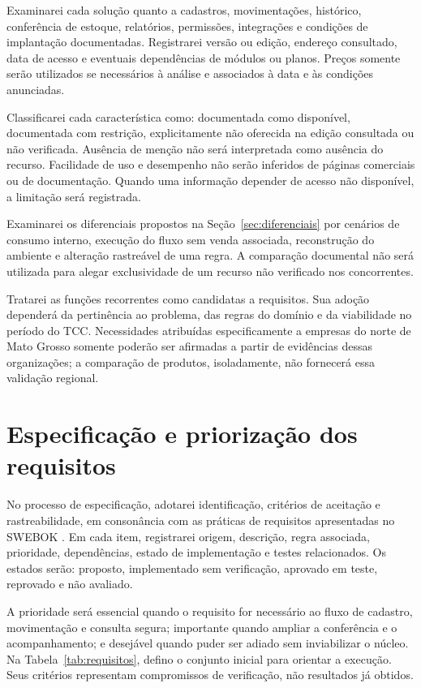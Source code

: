Examinarei cada solução quanto a cadastros, movimentações, histórico, conferência de estoque, relatórios, permissões, integrações e condições de implantação documentadas. Registrarei versão ou edição, endereço consultado, data de acesso e eventuais dependências de módulos ou planos. Preços somente serão utilizados se necessários à análise e associados à data e às condições anunciadas.

Classificarei cada característica como: documentada como disponível, documentada com restrição, explicitamente não oferecida na edição consultada ou não verificada. Ausência de menção não será interpretada como ausência do recurso. Facilidade de uso e desempenho não serão inferidos de páginas comerciais ou de documentação. Quando uma informação depender de acesso não disponível, a limitação será registrada.

Examinarei os diferenciais propostos na Seção~\ref{sec:diferenciais} por cenários de consumo interno, execução do fluxo sem venda associada, reconstrução do ambiente e alteração rastreável de uma regra. A comparação documental não será utilizada para alegar exclusividade de um recurso não verificado nos concorrentes.

Tratarei as funções recorrentes como candidatas a requisitos. Sua adoção dependerá da pertinência ao problema, das regras do domínio e da viabilidade no período do TCC. Necessidades atribuídas especificamente a empresas do norte de Mato Grosso somente poderão ser afirmadas a partir de evidências dessas organizações; a comparação de produtos, isoladamente, não fornecerá essa validação regional.

\section{Especificação e priorização dos requisitos}

No processo de especificação, adotarei identificação, critérios de aceitação e rastreabilidade, em consonância com as práticas de requisitos apresentadas no SWEBOK \cite{SWEBOK2026}. Em cada item, registrarei origem, descrição, regra associada, prioridade, dependências, estado de implementação e testes relacionados. Os estados serão: proposto, implementado sem verificação, aprovado em teste, reprovado e não avaliado.

A prioridade será essencial quando o requisito for necessário ao fluxo de cadastro, movimentação e consulta segura; importante quando ampliar a conferência e o acompanhamento; e desejável quando puder ser adiado sem inviabilizar o núcleo. Na Tabela~\ref{tab:requisitos}, defino o conjunto inicial para orientar a execução. Seus critérios representam compromissos de verificação, não resultados já obtidos.

